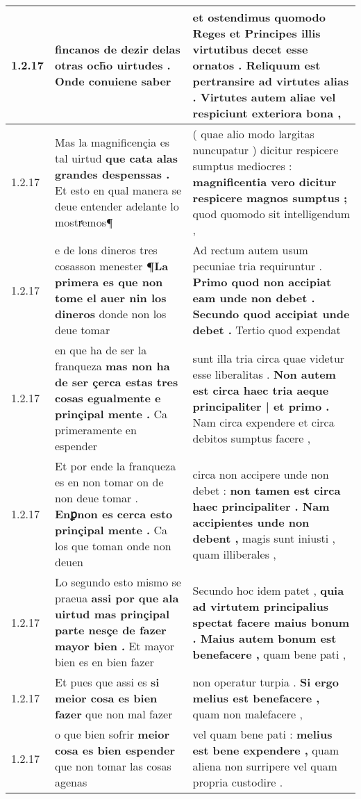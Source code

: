 \begin{tabular}{|p{1cm}|p{6.5cm}|p{6.5cm}|}
1.2.17 & fincanos \textbf{ de dezir delas otras och̃o uirtudes . } Onde conuiene saber & et ostendimus quomodo Reges et Principes illis virtutibus decet esse ornatos . \textbf{ Reliquum est pertransire ad virtutes alias . } Virtutes autem aliae vel respiciunt exteriora bona , \\\hline
1.2.17 & Mas la magnificençia es tal uirtud \textbf{ que cata alas grandes despenssas . } Et esto en qual manera se deue entender adelante lo mostrͣemos¶ & ( quae alio modo largitas nuncupatur ) dicitur respicere sumptus mediocres : \textbf{ magnificentia vero dicitur respicere magnos sumptus ; } quod quomodo sit intelligendum , \\\hline
1.2.17 & e de lons dineros tres cosasson menester \textbf{ ¶La primera es que non tome el auer nin los dineros } donde non los deue tomar & Ad rectum autem usum pecuniae tria requiruntur . \textbf{ Primo quod non accipiat eam unde non debet . Secundo quod accipiat unde debet . } Tertio quod expendat \\\hline
1.2.17 & en que ha de ser la franqueza \textbf{ mas non ha de ser çerca estas tres cosas egualmente e prinçipal mente . } Ca primeramente en espender & sunt illa tria circa quae videtur esse liberalitas . \textbf{ Non autem est circa haec tria aeque principaliter | et primo . } Nam circa expendere et circa debitos sumptus facere , \\\hline
1.2.17 & Et por ende la franqueza es en non tomar on de non deue tomar . \textbf{ Enꝑnon es cerca esto prinçipal mente . } Ca los que toman onde non deuen & circa non accipere unde non debet : \textbf{ non tamen est circa haec principaliter . Nam accipientes unde non debent , } magis sunt iniusti , quam illiberales , \\\hline
1.2.17 & Lo segundo esto mismo se praeua \textbf{ assi por que ala uirtud mas prinçipal parte nesçe de fazer mayor bien . } Et mayor bien es en bien fazer & Secundo hoc idem patet , \textbf{ quia ad virtutem principalius spectat facere maius bonum . Maius autem bonum est benefacere , } quam bene pati , \\\hline
1.2.17 & Et pues que assi es \textbf{ si meior cosa es bien fazer } que non mal fazer & non operatur turpia . \textbf{ Si ergo melius est benefacere , } quam non malefacere , \\\hline
1.2.17 & o que bien sofrir \textbf{ meior cosa es bien espender } que non tomar las cosas agenas & vel quam bene pati : \textbf{ melius est bene expendere , } quam aliena non surripere vel quam propria custodire . \\\hline

\end{tabular}
